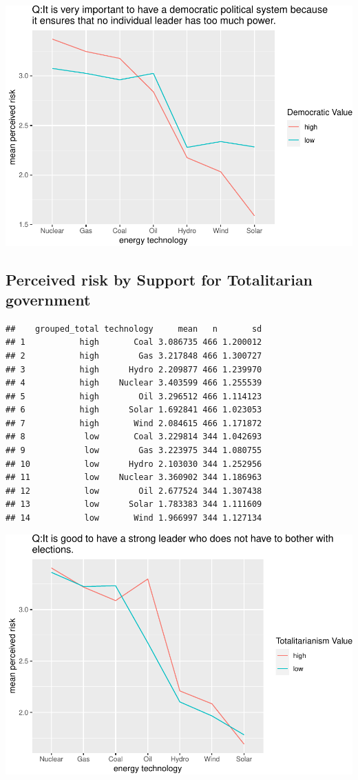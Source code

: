 \documentclass[
]{article}
\begin{document}
\includegraphics{Significant_results_files/figure-latex/unnamed-chunk-19-1.pdf}

\newpage

\hypertarget{perceived-risk-by-support-for-totalitarian-government}{%
\subsection{Perceived risk by Support for Totalitarian
government}\label{perceived-risk-by-support-for-totalitarian-government}}

\begin{verbatim}
##    grouped_total technology     mean   n       sd
## 1           high       Coal 3.086735 466 1.200012
## 2           high        Gas 3.217848 466 1.300727
## 3           high      Hydro 2.209877 466 1.239970
## 4           high    Nuclear 3.403599 466 1.255539
## 5           high        Oil 3.296512 466 1.114123
## 6           high      Solar 1.692841 466 1.023053
## 7           high       Wind 2.084615 466 1.171872
## 8            low       Coal 3.229814 344 1.042693
## 9            low        Gas 3.223975 344 1.080755
## 10           low      Hydro 2.103030 344 1.252956
## 11           low    Nuclear 3.360902 344 1.186963
## 12           low        Oil 2.677524 344 1.307438
## 13           low      Solar 1.783383 344 1.111609
## 14           low       Wind 1.966997 344 1.127134
\end{verbatim}

\includegraphics{Significant_results_files/figure-latex/unnamed-chunk-20-1.pdf}
\end{document}
